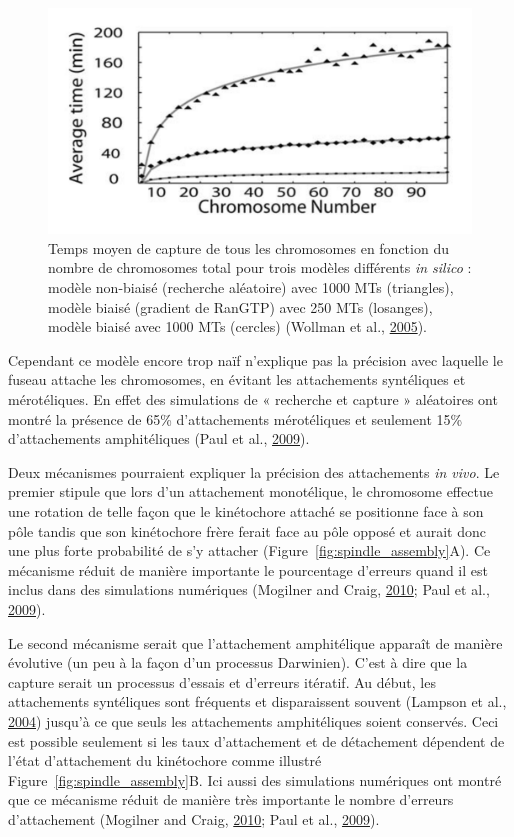 \documentclass[12pt,a4paper,twoside,openright]{book}
\begin{document}
\begin{figure}[htbp]
\centering
\includegraphics{figures/intro/assembly_time.png}
\caption[Temps moyen de capture des chromosomes]{\label{fig:assembly_time}Temps
moyen de capture de tous les chromosomes en fonction du nombre de
chromosomes total pour trois modèles différents \emph{in silico} :
modèle non-biaisé (recherche aléatoire) avec 1000 MTs (triangles),
modèle biaisé (gradient de RanGTP) avec 250 MTs (losanges), modèle
biaisé avec 1000 MTs (cercles) (Wollman et al.,
\hyperref[ref-Wollman2005]{2005}).}
\end{figure}

Cependant ce modèle encore trop naïf n'explique pas la précision avec
laquelle le fuseau attache les chromosomes, en évitant les attachements
syntéliques et mérotéliques. En effet des simulations de « recherche et
capture » aléatoires ont montré la présence de 65\% d'attachements
mérotéliques et seulement 15\% d'attachements amphitéliques (Paul et
al., \hyperref[ref-Paul2009]{2009}).

Deux mécanismes pourraient expliquer la précision des attachements
\emph{in vivo}. Le premier stipule que lors d'un attachement
monotélique, le chromosome effectue une rotation de telle façon que le
kinétochore attaché se positionne face à son pôle tandis que son
kinétochore frère ferait face au pôle opposé et aurait donc une plus
forte probabilité de s'y attacher (Figure~\ref{fig:spindle_assembly}A).
Ce mécanisme réduit de manière importante le pourcentage d'erreurs quand
il est inclus dans des simulations numériques (Mogilner and Craig,
\hyperref[ref-Mogilner2010]{2010}; Paul et al.,
\hyperref[ref-Paul2009]{2009}).

Le second mécanisme serait que l'attachement amphitélique apparaît de
manière évolutive (un peu à la façon d'un processus Darwinien). C'est à
dire que la capture serait un processus d'essais et d'erreurs itératif.
Au début, les attachements syntéliques sont fréquents et disparaissent
souvent (Lampson et al., \hyperref[ref-Lampson2004]{2004}) jusqu'à ce
que seuls les attachements amphitéliques soient conservés. Ceci est
possible seulement si les taux d'attachement et de détachement dépendent
de l'état d'attachement du kinétochore comme illustré
Figure~\ref{fig:spindle_assembly}B. Ici aussi des simulations numériques
ont montré que ce mécanisme réduit de manière très importante le nombre
d'erreurs d'attachement (Mogilner and Craig,
\hyperref[ref-Mogilner2010]{2010}; Paul et al.,
\hyperref[ref-Paul2009]{2009}).
\end{document}
